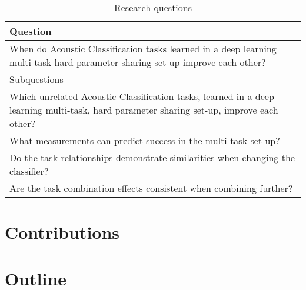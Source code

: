\begin{table}[ht]
	\caption{Research questions} %
	\centering %
	\begin{tabular}{p{\textwidth}} %
		\hline\hline %
		Question \\ [0.5ex] %
		\hline %
		When do Acoustic Classification tasks learned in a deep learning multi-task hard parameter sharing set-up improve each other? \\ %
		
		\hline\hline %
		Subquestions \\ [0.5ex] %
		\hline
		Which unrelated Acoustic Classification tasks, learned in a deep learning multi-task, hard parameter sharing set-up, improve each other? \\
		\hline %
		What measurements can predict success in the multi-task set-up? \\
		
		\hline
		Do the task relationships demonstrate similarities when changing the classifier?\\
		
		\hline
		Are the task combination effects consistent when combining further?
				
		\\ [1ex] %
		\hline %
	\end{tabular}
	\label{table:questions} %
\end{table}

\section{Contributions}

\section{Outline}